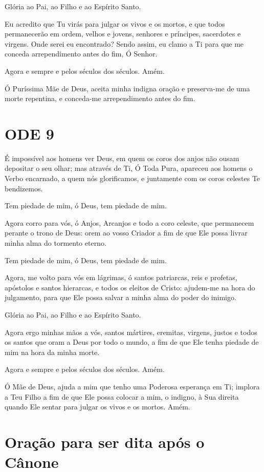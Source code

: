 \documentclass{subfiles}
\begin{document}
Glória ao Pai, ao Filho e ao Espírito Santo.

Eu acredito que Tu virás para julgar os vivos e os mortos, e que todos
permanecerão em ordem, velhos e jovens, senhores e príncipes, sacerdotes e
virgens. Onde serei eu encontrado? Sendo assim, eu clamo a Ti para que me
conceda arrependimento antes do fim, Ó Senhor.

Agora e sempre e pelos séculos dos séculos. Amém.

\theotokion{}Ó Puríssima Mãe de Deus, aceita minha indigna oração e
preserva-me de uma morte repentina, e conceda-me arrependimento antes
do fim.

\section*{ODE 9}

\eirmos{}É impossível aos homens ver Deus, em quem os coros dos anjos não
ousam depositar o seu olhar; mas através de Ti, Ó Toda Pura, apareceu aos
homens o Verbo encarnado, a quem nós glorificamos, e juntamente com os
coros celestes Te bendizemos.

Tem piedade de mim, ó Deus, tem piedade de mim.

Agora corro para vós, ó Anjos, Arcanjos e todo a coro celeste, que
permanecem perante o trono de Deus: orem ao vosso Criador a fim de que Ele
possa livrar minha alma do tormento eterno.

Tem piedade de mim, ó Deus, tem piedade de mim.

Agora, me volto para vós em lágrimas, ó santos patriarcas, reis e
profetas, apóstolos e santos hierarcas, e todos os eleitos de Cristo: ajudem-me
na hora do julgamento, para que Ele possa salvar a minha alma do poder do
inimigo.

Glória ao Pai, ao Filho e ao Espírito Santo.

Agora ergo minhas mãos a vós, santos mártires, eremitas, virgens,
justos e todos os santos que oram a Deus por todo o mundo, a fim de que Ele
tenha piedade de mim na hora da minha morte.

Agora e sempre e pelos séculos dos séculos. Amém.

\theotokion{}Ó Mãe de Deus, ajuda a mim que tenho uma Poderosa esperança
em Ti; implora a Teu Filho a fim de que Ele possa colocar a mim, o indigno, à
Sua direita quando Ele sentar para julgar os vivos e os mortos. Amém.

\section*{Oração para ser dita após o Cânone}
\end{document}
